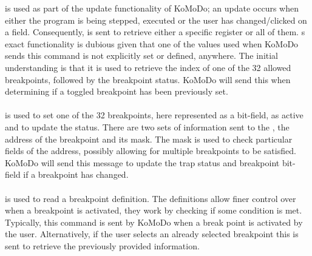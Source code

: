%
 is used as part of the update functionality of KoMoDo; an update occurs when either the program is being stepped, executed or the user has changed/clicked on a field. Consequently,  is sent to retrieve either a specific register or all of them.
%
%
%
%
s exact functionality is dubious given that one of the values used when KoMoDo sends this command is not explicitly set or defined, anywhere. The initial understanding is that it is used to retrieve the index of one of the 32 allowed breakpoints, followed by the breakpoint status. KoMoDo will send this when determining if a toggled breakpoint has been previously set.\\\\
%
 is used to set one of the 32 breakpoints, here represented as a bit-field, as active and to update the status. There are two sets of information sent to the , the address of the breakpoint and its mask. The mask is used to check particular fields of the address, possibly allowing for multiple breakpoints to be satisfied. KoMoDo will send this message to update the trap status and breakpoint bit-field if a breakpoint has changed.\\\\
%
 is used to read a breakpoint definition. The definitions allow finer control over when a breakpoint is activated, they work by checking if some condition is met. Typically, this command is sent by KoMoDo when a break point is activated by the user. Alternatively, if the user selects an already selected breakpoint this is sent to retrieve the previously provided information.\\\\
